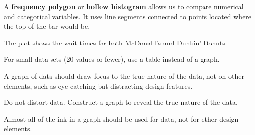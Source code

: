 \documentclass[handout]{beamer}
\begin{document}
\begin{frame}
\begin{definition}
A \textbf{frequency polygon} or \textbf{hollow histogram} allows us to compare numerical and categorical variables. It uses line segments connected to points located where the top of the bar would be. 
\end{definition}\pause
\begin{example}
The plot shows the wait times for both McDonald's and Dunkin' Donuts.
\begin{center}
\end{center}
\end{example}
\end{frame}

\begin{frame}
\begin{note}
For small data sets (20 values or fewer), use a table instead of a graph.
\end{note}\pause

\begin{note}
A graph of data should draw focus to the true nature of the data, not on other elements, such as eye-catching but distracting design features.
\end{note}\pause

\begin{note}
Do not distort data. Construct a graph to reveal the true nature of the data.
\end{note}\pause

\begin{note}
Almost all of the ink in a graph should be used for data, not for other design elements.
\end{note}
\end{frame}
\end{document}
